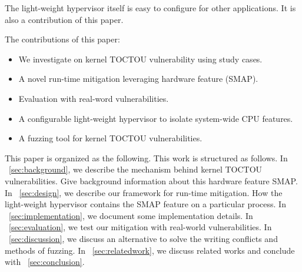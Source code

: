 The light-weight hypervisor itself is easy to configure for other applications. It is also a contribution of this paper.



The contributions of this paper:
\begin{itemize}[leftmargin=*]
    \item We investigate on kernel TOCTOU vulnerability using study cases.
    \item A novel run-time mitigation leveraging hardware feature (SMAP). 
    \item Evaluation with real-word vulnerabilities.
    \item A configurable light-weight hypervisor to isolate system-wide CPU features.
    \item A fuzzing tool for kernel TOCTOU vulnerabilities.
\end{itemize}



This paper is organized as the following. 
This work is structured as follows. In ~\autoref{sec:background}, we describe the mechanism behind kernel TOCTOU vulnerabilities. Give background information about this hardware feature SMAP. In ~\autoref{sec:design}, we describe our framework for run-time mitigation. How the light-weight hypervisor contains the SMAP feature on a particular process. In ~\autoref{sec:implementation}, we document some implementation details. In ~\autoref{sec:evaluation}, we test our mitigation with real-world vulnerabilities.  In ~\autoref{sec:discussion},  we discuss an alternative to solve the writing conflicts and methods of fuzzing. In ~\autoref{sec:relatedwork}, we discuss related works and conclude with ~\autoref{sec:conclusion}.
